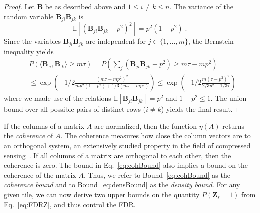 \begin{proof}
Let $\mathbf{B}$ be as described above and $1\leq i\neq k\leq n$. The variance of the random variable $\mathbf{B}_{ji}\mathbf{B}_{jk}$ is
\[\mathbb{E}\left[\left(\mathbf{B}_{ji}\mathbf{B}_{jk}-p^2\right)^2\right]=p^2(1-p^2)\;.\]
Since the variables $\mathbf{B}_{ji}\mathbf{B}_{jk}$ are independent for $j\in\{1,\ldots,m\}$, the Bernstein inequality yields 
\begin{align*}
&P(\langle \mathbf{B}_{\cdot i},\mathbf{B}_{\cdot k}\rangle\geq m\tau) 
=P\left(\sum_j \left(\mathbf{B}_{j i}\mathbf{B}_{j k}-p^2\right)\geq m\tau-mp^2\right)\\
&\leq \exp\left(-1/2 \frac{(m\tau-mp^2)^2}{mp^2(1-p^2)+1/3(m\tau-mp^2)}\right)
\leq \exp\left(-1/2 \frac{m(\tau-p^2)^2}{2/3p^2+1/3\tau}\right)
\end{align*}
where we made use of the relations $\mathbb{E}[\mathbf{B}_{ji}\mathbf{B}_{jk}]=p^2$ and $1-p^2\leq 1$.
The union bound over all possible pairs of distinct rows ($i\neq k$) yields the final result.
\end{proof}

If the columns of a matrix $A$ are normalized, then the function $\eta(A)$ returns the \emph{coherence} of $A$. The coherence measures how close the column vectors are to an orthogonal system, an extensively studied property in the field of compressed sensing~\citep{foucart2013mathematical}. If all columns of a matrix are orthogonal to each other, then the coherence is zero. The bound in Eq.~\eqref{eq:cohBound} also implies a bound on the coherence of the matrix $A$. Thus, we refer to Bound~\eqref{eq:cohBound} as the \emph{coherence bound} and to Bound~\eqref{eq:densBound} as the \emph{density bound}. For any given tile, we can now derive two upper bounds on the quantity $P(\mathbf{Z}_s=1)$ from Eq.~\eqref{eq:FDRZ}, and thus control the FDR.

